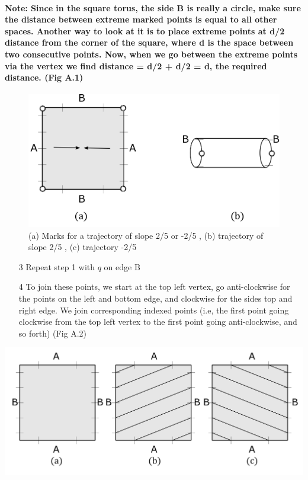 \documentclass{report}
\begin{document}
\paragraph{Note: Since in the square torus, the side B is really a circle, make sure the distance between extreme marked points is equal to all other spaces. Another way to look at it is to place extreme points at d/2 distance from the corner of the square, where d is the space between two consecutive points. Now, when we go between the extreme points via the vertex we find distance = d/2 + d/2 = d, the required distance. (Fig A.1)}

\begin{figure} 
\begin{center}
\includegraphics[scale=0.3]{a.1}
\caption{(a) Marks for a trajectory of slope 2/5 or -2/5 , (b) trajectory of slope 2/5 , (c) trajectory -2/5}
\end{center}
\end{figure}

\begin{enumerate}
\item[3]  {Repeat step 1 with $q$ on edge B}

\item[4]  {To join these points, we start at the top left vertex, go anti-clockwise for the points on the left and bottom edge, and clockwise for the sides top and right edge. We join corresponding indexed points (i.e, the first point going clockwise from the top left vertex to the first point going anti-clockwise, and so forth) (Fig A.2)}
\end{enumerate}

\begin{center}
\includegraphics[scale=0.3]{a.2}
\end{center}
\end{document}
